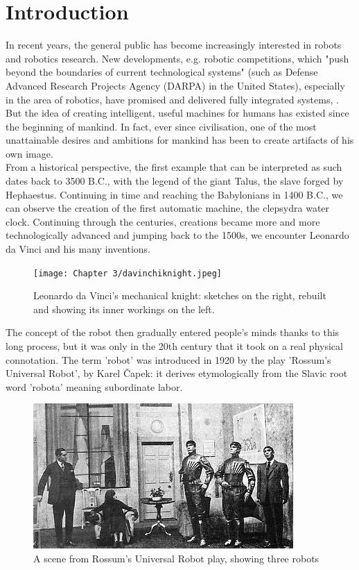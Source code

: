 \section{Introduction}
In recent years, the general public has become increasingly interested in robots and robotics research. New developments, e.g. robotic competitions, which "push beyond the boundaries of current technological
systems" (such as Defense Advanced Research Projects Agency (DARPA) in the
United States), especially in the area of robotics, have promised and delivered
fully integrated systems, \citet{robocomp}.\\
But the idea of creating intelligent, useful machines for humans has existed since the beginning of mankind.
In fact, ever since civilisation, one of the most unattainable desires and ambitions for mankind has been to create artifacts of his own image.\\
From a historical perspective, the first example that can be interpreted as such dates back to 3500 B.C., with the legend of the giant Talus, the slave forged by Hephaestus.
Continuing in time and reaching the Babylonians in 1400 B.C., we can observe the creation of the first automatic machine, the clepsydra water clock.
Continuing through the centuries, creations became more and more technologically advanced and jumping back to the 1500s, we encounter Leonardo da Vinci and his many inventions.
\begin{figure}[H]
    \centering
    \texttt{[image: Chapter 3/davinchiknight.jpeg]}
    \caption{Leonardo da Vinci’s mechanical knight: sketches on the right, rebuilt
and showing its inner workings on the left.}
    \label{fig:my_label}
\end{figure}
The concept of the robot then gradually entered people's minds thanks to this long process, but it was only in the 20th century that it took on a real physical connotation.
\newline
The term 'robot' was introduced in 1920 by the play 'Rossum's Universal Robot', by Karel Čapek: it derives etymologically from the Slavic root word 'robota' meaning subordinate labor.
\begin{figure}[H]
    \centering
    \includegraphics{Images/Chapter 3/rossumplay.jpg}
    \caption{A scene from Rossum's Universal Robot play, showing three robots}
    \label{fig:rossum}
\end{figure}
